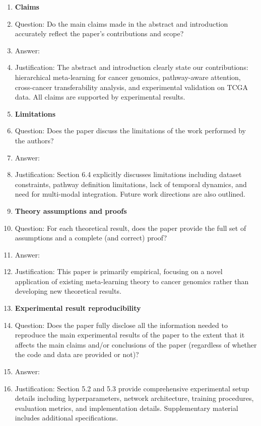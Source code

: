 \documentclass{article}
\begin{document}
\begin{enumerate}

\item {\bf Claims}
    \item[] Question: Do the main claims made in the abstract and introduction accurately reflect the paper's contributions and scope?
    \item[] Answer: \answerYes{}
    \item[] Justification: The abstract and introduction clearly state our contributions: hierarchical meta-learning for cancer genomics, pathway-aware attention, cross-cancer transferability analysis, and experimental validation on TCGA data. All claims are supported by experimental results.

\item {\bf Limitations}
    \item[] Question: Does the paper discuss the limitations of the work performed by the authors?
    \item[] Answer: \answerYes{}
    \item[] Justification: Section 6.4 explicitly discusses limitations including dataset constraints, pathway definition limitations, lack of temporal dynamics, and need for multi-modal integration. Future work directions are also outlined.

\item {\bf Theory assumptions and proofs}
    \item[] Question: For each theoretical result, does the paper provide the full set of assumptions and a complete (and correct) proof?
    \item[] Answer: \answerNA{}
    \item[] Justification: This paper is primarily empirical, focusing on a novel application of existing meta-learning theory to cancer genomics rather than developing new theoretical results.

\item {\bf Experimental result reproducibility}
    \item[] Question: Does the paper fully disclose all the information needed to reproduce the main experimental results of the paper to the extent that it affects the main claims and/or conclusions of the paper (regardless of whether the code and data are provided or not)?
    \item[] Answer: \answerYes{}
    \item[] Justification: Section 5.2 and 5.3 provide comprehensive experimental setup details including hyperparameters, network architecture, training procedures, evaluation metrics, and implementation details. Supplementary material includes additional specifications.


\end{enumerate}
\end{document}
